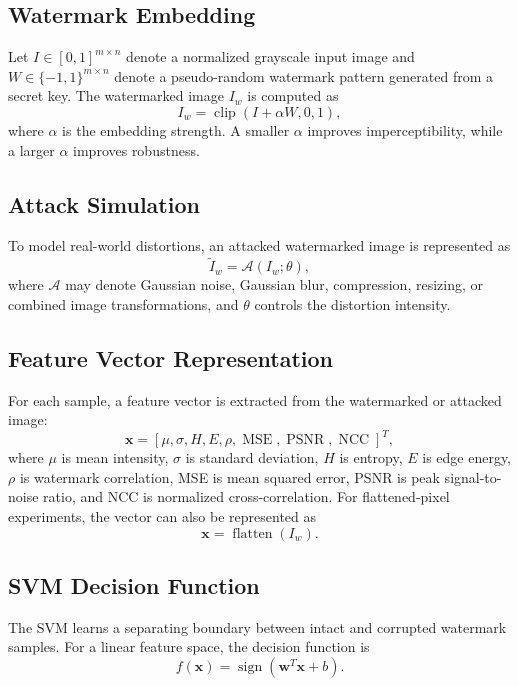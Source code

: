 \documentclass[conference]{IEEEtran}
\begin{document}
\subsection{Watermark Embedding}
Let $I \in [0,1]^{m \times n}$ denote a normalized grayscale input image and $W \in \{-1,1\}^{m \times n}$ denote a pseudo-random watermark pattern generated from a secret key. The watermarked image $I_w$ is computed as
\begin{equation}
I_w = \operatorname{clip}(I + \alpha W, 0, 1),
\label{eq:embedding}
\end{equation}
where $\alpha$ is the embedding strength. A smaller $\alpha$ improves imperceptibility, while a larger $\alpha$ improves robustness.

\subsection{Attack Simulation}
To model real-world distortions, an attacked watermarked image is represented as
\begin{equation}
\tilde{I}_w = \mathcal{A}(I_w;\theta),
\label{eq:attack}
\end{equation}
where $\mathcal{A}$ may denote Gaussian noise, Gaussian blur, compression, resizing, or combined image transformations, and $\theta$ controls the distortion intensity.

\subsection{Feature Vector Representation}
For each sample, a feature vector is extracted from the watermarked or attacked image:
\begin{equation}
\mathbf{x} = [\mu, \sigma, H, E, \rho, \operatorname{MSE}, \operatorname{PSNR}, \operatorname{NCC}]^T,
\label{eq:feature}
\end{equation}
where $\mu$ is mean intensity, $\sigma$ is standard deviation, $H$ is entropy, $E$ is edge energy, $\rho$ is watermark correlation, MSE is mean squared error, PSNR is peak signal-to-noise ratio, and NCC is normalized cross-correlation. For flattened-pixel experiments, the vector can also be represented as
\begin{equation}
\mathbf{x} = \operatorname{flatten}(I_w).
\label{eq:flatten}
\end{equation}

\subsection{SVM Decision Function}
The SVM learns a separating boundary between intact and corrupted watermark samples. For a linear feature space, the decision function is
\begin{equation}
f(\mathbf{x}) = \operatorname{sign}(\mathbf{w}^{T}\mathbf{x}+b).
\label{eq:linear_svm}
\end{equation}
\end{document}
